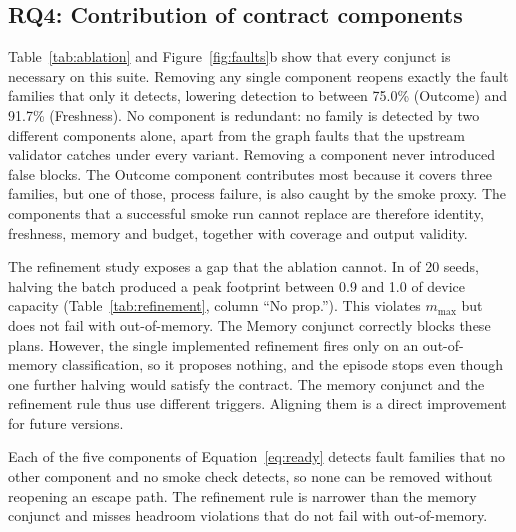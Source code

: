 \subsection{RQ4: Contribution of contract components}\label{sec:rq4}
Table~\ref{tab:ablation} and Figure~\ref{fig:faults}b show that every conjunct is necessary on this suite. Removing any single component reopens exactly the fault families that only it detects, lowering detection to between 75.0\% (Outcome) and 91.7\% (Freshness). No component is redundant: no family is detected by two different components alone, apart from the graph faults that the upstream validator catches under every variant. Removing a component never introduced false blocks. The Outcome component contributes most because it covers three families, but one of those, process failure, is also caught by the smoke proxy. The components that a successful smoke run cannot replace are therefore identity, freshness, memory and budget, together with coverage and output validity.

\begin{table}[t]
\caption{Leave-one-conjunct-out ablation on the mutation suite (\MutationFaultCases{} faulty and \MutationCleanCases{} clean cases per variant). No variant blocked a clean control.}\label{tab:ablation}
\small\setlength{\tabcolsep}{4pt}
\end{table}

The refinement study exposes a gap that the ablation cannot. In \HeadroomGapSeeds{} of 20 seeds, halving the batch produced a peak footprint between 0.9 and 1.0 of device capacity (Table~\ref{tab:refinement}, column ``No prop.''). This violates $m_{\max}$ but does not fail with out-of-memory. The Memory conjunct correctly blocks these plans. However, the single implemented refinement fires only on an out-of-memory classification, so it proposes nothing, and the episode stops even though one further halving would satisfy the contract. The memory conjunct and the refinement rule thus use different triggers. Aligning them is a direct improvement for future versions.

\begin{tcolorbox}[rqbox, title={Answer to RQ4}]
Each of the five components of Equation~\eqref{eq:ready} detects fault families that no other component and no smoke check detects, so none can be removed without reopening an escape path. The refinement rule is narrower than the memory conjunct and misses headroom violations that do not fail with out-of-memory.
\end{tcolorbox}



